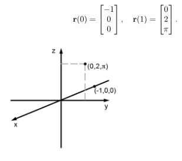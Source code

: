 \documentclass{article}
\begin{document}
\begin{enumerate}
\begin{align*}
  \mathbf{r}(0) &= \begin{bmatrix} -1 \\ 0 \\ 0 \end{bmatrix} , \quad
  \mathbf{r}(1) = \begin{bmatrix} 0 \\ 2 \\ \pi \end{bmatrix}.
\end{align*}
\EEN
\begin{figure}[h]
  \vspace{-10pt}
  \begin{center}
    \includegraphics[width=0.45\textwidth]{ImgParticle.jpg}
  \end{center}
  \vspace{-20pt}
\end{figure}
\end{enumerate} %
\end{document}
